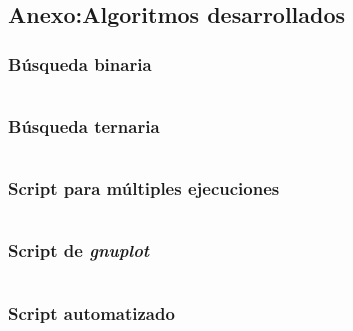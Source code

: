 \documentclass[12pt,spanish]{article}
\begin{document}
\subsection{Anexo:Algoritmos desarrollados}

\subsubsection{Búsqueda binaria}

\inputminted[linenos, fontsize=\footnotesize]{c++}{busqueda_binaria.cpp}

\newpage
\subsubsection{Búsqueda ternaria}

\inputminted[linenos, fontsize=\footnotesize]{c++}{busqueda_ternaria.cpp}


\subsubsection{Script para múltiples ejecuciones}
\label{script}

\inputminted[linenos, fontsize=\footnotesize]{bash}{individual.sh}

\subsubsection{Script de \emph{gnuplot}}

\inputminted[linenos, fontsize=\footnotesize]{bash}{gnuplot.sh}

\subsubsection{Script automatizado}

\inputminted[linenos, fontsize=\footnotesize]{bash}{all.sh}
\end{document}
